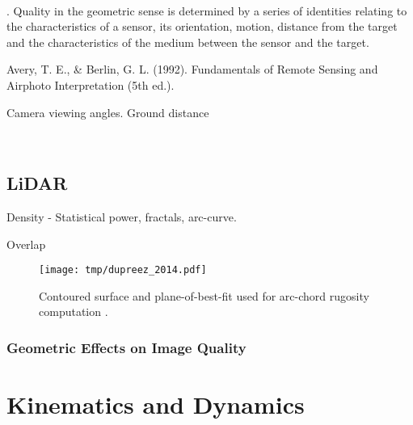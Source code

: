 ~~~

 \cite{Gupta2018}. 
Quality in the geometric sense is determined by a series of identities relating to the characteristics of a sensor, its orientation, motion, distance from the target and the characteristics of the medium between the sensor and the target.

\cite{Avery1992}
Avery, T. E., \& Berlin, G. L. (1992). Fundamentals of Remote Sensing and Airphoto Interpretation (5th ed.).

Camera viewing angles.
Ground distance

~~~



\subsection{LiDAR}

Density - Statistical power, fractals, arc-curve.

Overlap

\begin{figure} %
\texttt{[image: tmp/dupreez\_2014.pdf]} 
\caption{Contoured surface and plane-of-best-fit used for arc-chord rugosity computation \cite{DuPreez2014}.}
\label{fig:arcchord}
\end{figure}


\subsubsection{Geometric Effects on Image Quality}


\section{Kinematics and Dynamics}






